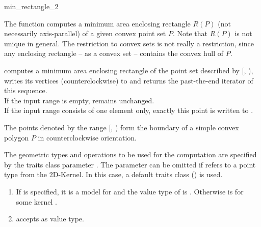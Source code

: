 
\cgalColumnLayout

\begin{ccRefFunction}{min_rectangle_2}
  
  \ccDefinition The function computes a minimum area enclosing
  rectangle $R(P)$ (not necessarily axis-parallel) of a given convex
  point set $P$.  Note that $R(P)$ is not unique in general. The
  restriction to convex sets is not really a restriction, since any
  enclosing rectangle -- as a convex set -- contains the convex hull
  of $P$.


  \def\ccLongParamLayout{\ccTrue} 
  
  
  computes a minimum area enclosing rectangle of the point set
  described by [, ), writes its
  vertices (counterclockwise) to  and returns the past-the-end
  iterator
  of this sequence.\\
  If the input range is empty,  remains unchanged.\\
  If the input range consists of one element only,
  exactly this point is written to .
  
  \ccPrecond The points denoted by the range [,
  ) form the boundary of a simple convex polygon $P$
  in counterclockwise orientation.
  
  The geometric types and operations to be used for the computation
  are specified by the traits class parameter . The parameter
  can be omitted if  refers to a point type from
  the 2D-Kernel. In this case, a default traits class
  () is used.
  
  \ccRequire
  \begin{enumerate}
  \item If  is specified, it is a model for
     and the value type  of
     is . Otherwise 
    is  for some kernel .
  \item {} accepts  as value type.
  \end{enumerate}
  

\end{ccRefFunction}
